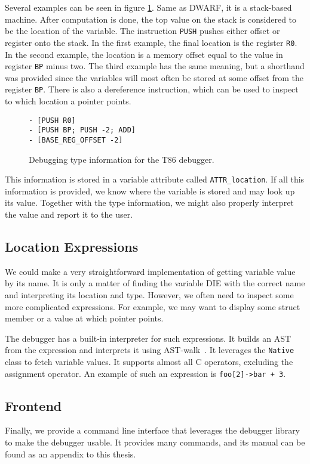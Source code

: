 Several examples can be seen in figure \ref{fig:t86dbg-vm}. Same as DWARF, it
is a stack-based machine. After computation is done, the top value on the stack
is considered to be the location of the variable. The instruction \texttt{PUSH}
pushes either offset or register onto the stack. In the first example, the
final location is the register \texttt{R0}. In the second example, the location
is a memory offset equal to the value in register \texttt{BP} minus two. The
third example has the same meaning, but a shorthand was provided since the
variables will most often be stored at some offset from the register
\texttt{BP}. There is also a dereference instruction, which can be used to
inspect to which location a pointer points.

\begin{figure}
    \begin{lstlisting}
- [PUSH R0]
- [PUSH BP; PUSH -2; ADD]
- [BASE_REG_OFFSET -2]
    \end{lstlisting}
    \caption{Debugging type information for the T86 debugger.}
    \label{fig:t86dbg-vm}
\end{figure}

This information is stored in a variable attribute called
\texttt{ATTR\_location}. If all this information is provided, we know where the
variable is stored and may look up its value. Together with the type
information, we might also properly interpret the value and report it to the
user.

\subsection{Location Expressions}
We could make a very straightforward implementation of getting variable value
by its name. It is only a matter of finding the variable DIE with the correct
name and interpreting its location and type. However, we often need to inspect
some more complicated expressions. For example, we may want to display some
struct member or a value at which pointer points.

The debugger has a built-in interpreter for such expressions. It builds an AST
from the expression and interprets it using
AST-walk~\cite{crafting-interpreters}. It leverages the \texttt{Native} class
to fetch variable values. It supports almost all C operators, excluding the
assignment operator. An example of such an expression is \texttt{foo[2]->bar + 3}.

\subsection{Frontend}
Finally, we provide a command line interface that leverages the debugger
library to make the debugger usable. It provides many commands, and its manual
can be found as an appendix to this thesis.

